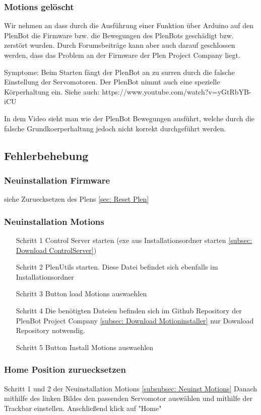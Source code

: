 \documentclass[11pt]{scrartcl}
\begin{document}
\subsubsection{Motions gelöscht}
\label{subsubsec: Motions gelöscht}
Wir nehmen an dass durch die Ausführung einer Funktion über Arduino auf den PlenBot die Firmware bzw. die Bewegungen des PlenBots geschädigt bzw. zerstört wurden. Durch Forumsbeiträge kann aber auch darauf geschlossen werden, dass das Problem an der Firmware der Plen Project Company liegt.


Symptome:
Beim Starten fängt der PlenBot an zu surren durch die falsche Einstellung der Servomotoren. Der PlenBot nimmt auch eine spezielle Körperhaltung ein.
Siehe auch: 
https://www.youtube.com/watch?v=yGtRbYB-iCU

In dem Video sieht man wie der PlenBot Bewegungen ausführt, welche durch die falsche Grundkoerperhaltung jedoch nicht korrekt durchgeführt werden.
 
\subsection{Fehlerbehebung}
\label{subsec: Fehlerbehebung}

\subsubsection{Neuinstallation Firmware}
\label{subsubsec: Neuinst Firmware}
 siehe Zuruecksetzen des Plens \autoref{sec: Reset Plen}
 
\subsubsection{Neuinstallation Motions}
\label{subsubsec: Neuinst Motions}

\begin{itemize}
\item[Schritt 1]
Control Server starten (exe aus Installationsordner starten \autoref{subsec: Download ControlServer})
\item[Schritt 2]
PlenUtils starten. Diese Datei befindet sich ebenfalls im Installationsordner
\item[Schritt 3]
Button load Motions auswaehlen
\item[Schritt 4]
Die benötigten Dateien befinden sich im Github Repository der PlenBot Project Company \autoref{subsec: Download Motioninstaller} nur Download Repository notwendig.
\item[Schritt 5]
Button Install Motions auswaehlen
\end{itemize}
\subsubsection{Home Position zuruecksetzen}
\label{subsubsec: Reset Home Position}
Schritt 1 und 2 der Neuinstallation Motions \autoref{subsubsec: Neuinst Motions}
Danach mithilfe des linken Bildes den passenden Servomotor auswählen und mithilfe der Trackbar einstellen. Anschließend klick auf "Home"
\end{document}
